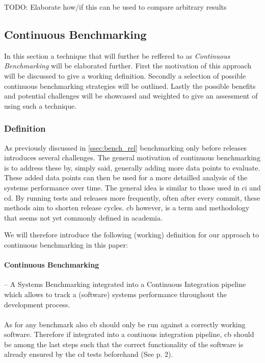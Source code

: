\documentclass[	runningheads,
				a4paper]{llncs}
\begin{document}
TODO: Elaborate how/if this can be used to compare arbitrary results

	\subsection{Continuous Benchmarking}
In this section a technique that will further be reffered to as \textit{Continuous Benchmarking} will be elaborated further. First the motivation of this approach will be discussed to give a working definition. Secondly a selection of possible continuous benchmarking strategies will be outlined. Lastly the possible benefits and potential challenges will be showcased and weighted to give an assessment of using such a technique.

	\subsubsection{Definition}
	As previously discussed in \autoref{ssec:bench_rel} benchmarking only before releases introduces several challenges. The general motivation of continuous benchmarking is to address these by, simply said, generally adding more data points to evaluate. These added data points can then be used for a more detailled analysis of the systems performance over time. The general idea is similar to those used in \gls{ci} and \gls{cd}. By running tests and releases more frequently, often after every commit, these methods aim to shorten release cycles. \gls{cb} however, is a term and methodology that seems not yet commonly defined in academia.

	We will therefore introduce the following (working) definition for our approach to continuous benchmarking in this paper:
	\paragraph{Continuous Benchmarking} -- A Systems Benchmarking integrated into a Continuous Integration pipeline which allows to track a (software) systems performance throughout the development process.

	\paragraph{}As for any benchmark also \gls{cb} should only be run against a correctly working software. Therefore if integrated into a contiuous integration pipeline, \gls{cb} should be among the last steps such that the correct functionality of the software is already ensured by the \gls{cd} tests beforehand (See \cite{grambow2019} p. 2).
\end{document}
